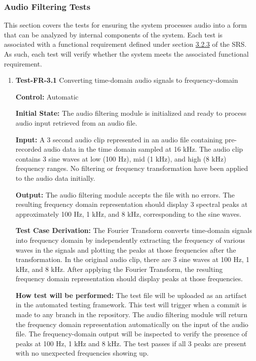 \documentclass[12pt, titlepage]{article}
\begin{document}
\subsubsection{Audio Filtering Tests}

This section covers the tests for ensuring the system processes audio into a 
form that can be analyzed by internal components of the system. Each test is 
associated with a functional requirement defined under section 
\hyperref[SRS-sec:FR3]{3.2.3} of the SRS. As such, each test will verify whether
 the system meets the associated functional requirement. 

\begin{enumerate}

\item{\textbf{Test-FR-3.1} Converting time-domain audio signals to 
frequency-domain \\}

\textbf{Control:} Automatic
					
\textbf{Initial State:} 
The audio filtering module is initialized and ready to process audio input 
retrieved from an audio file. 
					
\textbf{Input:}
A 3 second audio clip represented in an audio file containing pre-recorded audio 
data in the time domain sampled at 16 kHz. The audio clip contains 3 sine waves 
at low (100 Hz), mid (1 kHz), and high (8 kHz) frequency ranges. No filtering 
or frequency transformation have been applied to the audio data initially.
					
\textbf{Output:}
The audio filtering module accepts the file with no errors. The resulting 
frequency domain representation should display 3 spectral peaks at 
approximately 100 Hz, 1 kHz, and 8 kHz, corresponding to the sine waves.

\textbf{Test Case Derivation:} 
The Fourier Transform converts time-domain signals into frequency domain by 
independently extracting the frequency of various waves in the signals and 
plotting the peaks at those frequencies after the transformation. In the 
original audio clip, there are 3 sine waves at 100 Hz, 1 kHz, and 8 kHz. After
applying the Fourier Transform, the resulting frequency domain representation
should display peaks at those frequencies.
					
\textbf{How test will be performed:}
The test file will be uploaded as an artifact in the automated testing 
framework. This test will trigger when a commit is made to any branch in the 
repository. The audio filtering module will return the frequency domain 
representation automatically on the input of the audio file. The 
frequency-domain output will be inspected to verify the presence of peaks at 
100 Hz, 1 kHz and 8 kHz. The test passes if all 3 peaks are present with no 
unexpected frequencies showing up.  
					

\end{enumerate}
\end{document}
